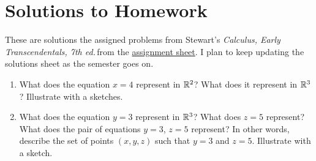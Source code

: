 \chapter{Solutions to Homework}
These are solutions the assigned problems from Stewart's \emph{Calculus,
  Early Transcendentals, 7th ed.}\,from the
\href{https://www.math.purdue.edu/academic/files/courses/2016spring/MA16600/166assignr1.pdf}{assignment
  sheet}. I plan to keep updating the solutions sheet as the semester goes
on.
\begin{problem}
\begin{enumerate}[label=(\alph*)]
\item What does the equation $x=4$ represent in $\mathbb{R}^2$? What does it
  represent in $\mathbb{R}^3$? Illustrate with a sketches.
\item What does the equation $y=3$ represent in $\mathbb{R}^3$? What does $z=5$
  represent? What does the pair of equations $y=3$, $z=5$ represent? In
  other words, describe the set of points $(x,y,z)$ such that $y=3$ and
  $z=5$. Illustrate with a sketch.
\end{enumerate}
\end{problem}
